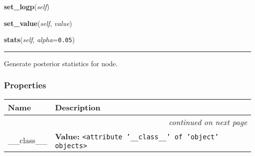     \label{pymc:PyMCObjects:Stochastic:set_logp}

    \vspace{0.5ex}

    \begin{boxedminipage}{\textwidth}

    \raggedright \textbf{set\_logp}(\textit{self})

    \end{boxedminipage}

    \label{pymc:PyMCObjects:Stochastic:set_value}

    \vspace{0.5ex}

    \begin{boxedminipage}{\textwidth}

    \raggedright \textbf{set\_value}(\textit{self}, \textit{value})

    \end{boxedminipage}

    \label{pymc:Node:Variable:stats}

    \vspace{0.5ex}

    \begin{boxedminipage}{\textwidth}

    \raggedright \textbf{stats}(\textit{self}, \textit{alpha}=\texttt{0.05})

    \vspace{-1.5ex}

    \rule{\textwidth}{0.5\fboxrule}

Generate posterior statistics for node.
    \vspace{1ex}

    \end{boxedminipage}



  \subsubsection{Properties}

\begin{longtable}{|p{}|p{}|l}
\cline{1-2}
\cline{1-2} \centering \textbf{Name} & \centering \textbf{Description}& \\
\cline{1-2}
\endhead\cline{1-2}\multicolumn{3}{r}{\small\textit{continued on next page}}\\\endfoot\cline{1-2}
\endlastfoot\raggedright \_\-\_\-c\-l\-a\-s\-s\-\_\-\_\- & \raggedright \textbf{Value:} 
{\tt {\textless}attribute '\_\_class\_\_' of 'object' objects{\textgreater}}&\\
\cline{1-2}
\end{longtable}



